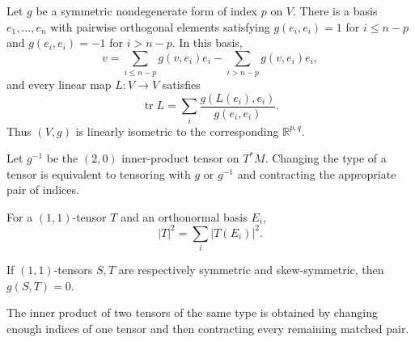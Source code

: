 \begin{remark}
  \label{rem:pet-ch1-ex-10}
  \leanok
  Let $g$ be a symmetric nondegenerate form of index $p$ on $V$. There is a
  basis $e_1,\ldots,e_n$ with pairwise orthogonal elements satisfying
  $g(e_i,e_i)=1$ for $i\le n-p$ and $g(e_i,e_i)=-1$ for $i>n-p$. In this basis,
  \[
    v=\sum_{i\le n-p}g(v,e_i)e_i-
      \sum_{i>n-p}g(v,e_i)e_i,
  \]
  and every linear map $L:V\to V$ satisfies
  \[
    \operatorname{tr}L
      =\sum_i\frac{g(L(e_i),e_i)}{g(e_i,e_i)}.
  \]
  Thus $(V,g)$ is linearly isometric to the corresponding $\mathbb{R}^{p,q}$.
\end{remark}

\begin{remark}
  \label{rem:pet-ch1-ex-11}
  \leanok
  Let $g^{-1}$ be the $(2,0)$ inner-product tensor on $T^*M$. Changing the type
  of a tensor is equivalent to tensoring with $g$ or $g^{-1}$ and contracting
  the appropriate pair of indices.
\end{remark}

\begin{remark}
  \label{rem:pet-ch1-ex-12}
  \leanok
  For a $(1,1)$-tensor $T$ and an orthonormal basis $E_i$,
  \[
    |T|^2=\sum_i|T(E_i)|^2.
  \]
\end{remark}

\begin{remark}
  \label{rem:pet-ch1-ex-13}
  \leanok
  If $(1,1)$-tensors $S,T$ are respectively symmetric and skew-symmetric, then
  $g(S,T)=0$.
\end{remark}

\begin{remark}
  \label{rem:pet-ch1-ex-14}
  \leanok
  The inner product of two tensors of the same type is obtained by changing
  enough indices of one tensor and then contracting every remaining matched
  pair.
\end{remark}


